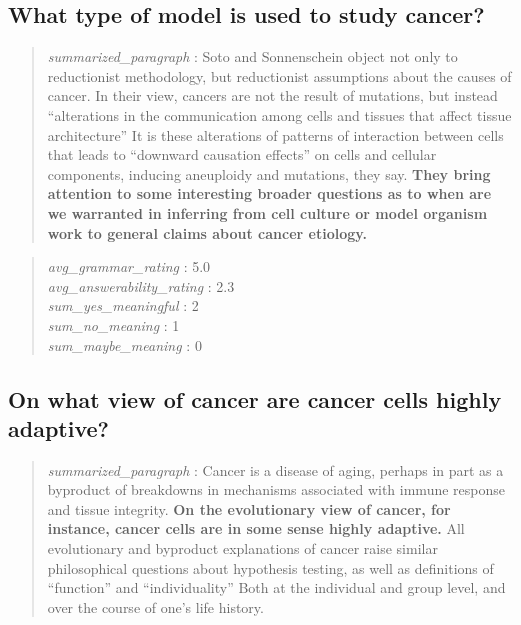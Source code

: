 \hypertarget{what-type-of-model-is-used-to-study-cancer}{%
\subsection{What type of model is used to study
cancer?}\label{what-type-of-model-is-used-to-study-cancer}}

\begin{quote}
\emph{summarized\_paragraph} : Soto and Sonnenschein object not only to
reductionist methodology, but reductionist assumptions about the causes
of cancer. In their view, cancers are not the result of mutations, but
instead ``alterations in the communication among cells and tissues that
affect tissue architecture'' It is these alterations of patterns of
interaction between cells that leads to ``downward causation effects''
on cells and cellular components, inducing aneuploidy and mutations,
they say. \textbf{They bring attention to some interesting broader
questions as to when are we warranted in inferring from cell culture or
model organism work to general claims about cancer etiology.}
\end{quote}

\begin{quote}
\emph{avg\_grammar\_rating} : 5.0\\
\emph{avg\_answerability\_rating} : 2.3\\
\emph{sum\_yes\_meaningful} : 2\\
\emph{sum\_no\_meaning} : 1\\
\emph{sum\_maybe\_meaning} : 0
\end{quote}

\hypertarget{on-what-view-of-cancer-are-cancer-cells-highly-adaptive}{%
\subsection{On what view of cancer are cancer cells highly
adaptive?}\label{on-what-view-of-cancer-are-cancer-cells-highly-adaptive}}

\begin{quote}
\emph{summarized\_paragraph} : Cancer is a disease of aging, perhaps in
part as a byproduct of breakdowns in mechanisms associated with immune
response and tissue integrity. \textbf{On the evolutionary view of
cancer, for instance, cancer cells are in some sense highly adaptive.}
All evolutionary and byproduct explanations of cancer raise similar
philosophical questions about hypothesis testing, as well as definitions
of ``function'' and ``individuality'' Both at the individual and group
level, and over the course of one's life history.
\end{quote}

